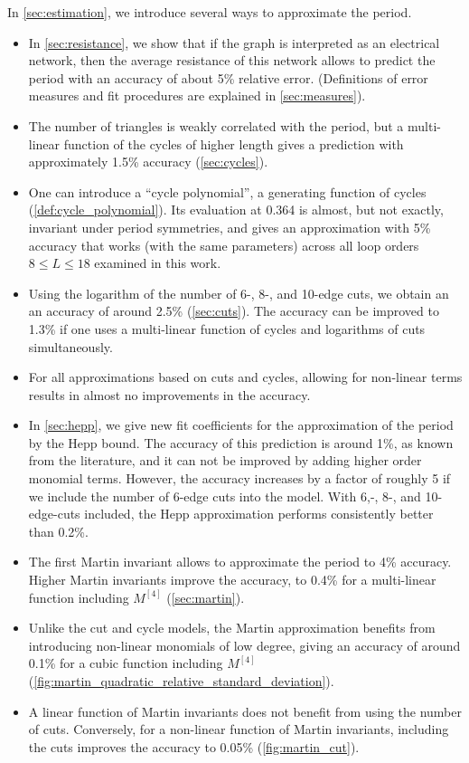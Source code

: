 \documentclass[12pt]{article}
\numberwithin{equation}{section}
\begin{document}
\medskip 
\noindent
In \cref{sec:estimation}, we introduce several ways to approximate the period. 
\begin{itemize}
	\item In \cref{sec:resistance}, we show that if the graph is interpreted as an electrical network, then the average resistance of this network allows to predict the period with an accuracy of about 5\% relative error. (Definitions of error measures and fit procedures are explained in \cref{sec:measures}).
	\item The number of triangles is weakly correlated with the period, but a multi-linear function of the cycles of higher length gives a prediction with approximately 1.5\% accuracy (\cref{sec:cycles}). 
	\item One can introduce a \enquote{cycle polynomial}, a generating function of cycles (\cref{def:cycle_polynomial}). Its evaluation at 0.364 is almost, but not exactly, invariant under period symmetries, and gives an approximation with 5\% accuracy that works (with the same parameters) across all loop orders $8 \leq L \leq 18$ examined in this work. 
	\item Using the logarithm of the number of 6-, 8-, and 10-edge cuts, we obtain an an accuracy of around 2.5\% (\cref{sec:cuts}). The accuracy can be improved to 1.3\% if one uses a multi-linear function of cycles and logarithms of cuts  simultaneously. 
	\item For all approximations based on cuts and cycles,  allowing for non-linear terms results in almost no improvements in the accuracy.
	\item In \cref{sec:hepp}, we give new fit coefficients for the approximation of the period by the Hepp bound. The accuracy of this prediction is around 1\%, as known from the literature, and it can not be improved by adding higher order monomial terms. However, the accuracy increases by a factor of roughly 5 if we include the number of 6-edge cuts into the model. With 6,-, 8-, and 10-edge-cuts included, the Hepp approximation performs consistently better than 0.2\%. 
	\item The first Martin invariant allows to approximate the period to 4\% accuracy. Higher Martin invariants  improve the accuracy, to 0.4\% for a multi-linear function including $M^{[4]}$ (\cref{sec:martin}). 
	\item Unlike the cut and cycle models, the Martin approximation benefits from introducing non-linear monomials of low degree, giving an accuracy of around  0.1\% for a cubic function including $M^{[4]}$ (\cref{fig:martin_quadratic_relative_standard_deviation}). 
	\item A  linear function of Martin invariants does not benefit from using the number of cuts. Conversely, for a non-linear function of Martin invariants, including the cuts  improves the accuracy to 0.05\% (\cref{fig:martin_cut}). 
\end{itemize}
\end{document}
